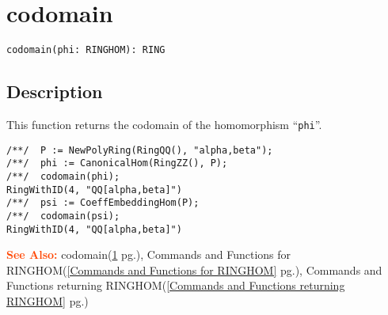 \documentclass[a4paper]{mybook}
\newenvironment{command}{}{} %
\newcommand\SeeAlso{\par\textcolor{OrangeRed}{\textbf{\large See Also: }}}
\begin{document}
\section{codomain}
\label{codomain}
\begin{command} %


\begin{Verbatim}[label=syntax, rulecolor=\color{MidnightBlue},
frame=single]
codomain(phi: RINGHOM): RING
\end{Verbatim}


\subsection*{Description}

This function returns the codomain of the homomorphism ``\verb&phi&''.
\begin{Verbatim}[label=example, rulecolor=\color{PineGreen}, frame=single]
/**/  P := NewPolyRing(RingQQ(), "alpha,beta");
/**/  phi := CanonicalHom(RingZZ(), P);
/**/  codomain(phi);
RingWithID(4, "QQ[alpha,beta]")
/**/  psi := CoeffEmbeddingHom(P);
/**/  codomain(psi);
RingWithID(4, "QQ[alpha,beta]")
\end{Verbatim}


\SeeAlso %
  codomain(\ref{codomain} pg.\pageref{codomain}), 
    Commands and Functions for RINGHOM(\ref{Commands and Functions for RINGHOM} pg.\pageref{Commands and Functions for RINGHOM}), 
    Commands and Functions returning RINGHOM(\ref{Commands and Functions returning RINGHOM} pg.\pageref{Commands and Functions returning RINGHOM})
\end{command} %
\end{document}
